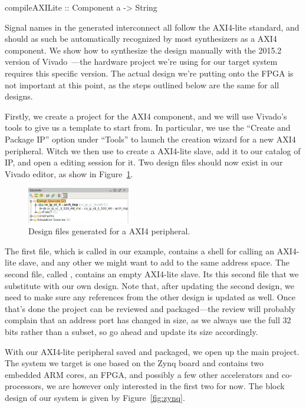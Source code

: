 \documentclass[../paper.tex]{subfiles}
\begin{document}
\begin{code}
compileAXILite :: Component a -> String
\end{code}

\noindent Signal names in the generated interconnect all follow the AXI4-lite standard, and should as such be automatically recognized by most synthesizers as a AXI4 component. We show how to synthesize the design manually with the 2015.2 version of Vivado~\cite{feist2012}---the hardware project we're using for our target system requires this specific version. The actual design we're putting onto the FPGA is not important at this point, as the steps outlined below are the same for all designs. 

Firstly, we create a project for the AXI4 component, and we will use Vivado's tools to give us a template to start from. In particular, we use the ``Create and Package IP'' option under ``Tools'' to launch the creation wizard for a new AXI4 peripheral. Witch we then use to create a AXI4-lite slave, add it to our catalog of IP, and open a editing session for it. Two design files should now exist in our Vivado editor, as show in Figure~\ref{fig:files}.

\begin{figure}[t]
\includegraphics[width=0.4\textwidth]{figures/DesignFiles}
\centering
\caption{Design files generated for a AXI4 peripheral.}
\label{fig:files}
\end{figure}

The first file, which is called  in our example, contains a shell for calling an AXI4-lite slave, and any other we might want to add to the same address space. The second file, called , contains an empty AXI4-lite slave. Its this second file that we substitute with our own design. Note that, after updating the second design, we need to make sure any references from the other design is updated as well. Once that’s done the project can be reviewed and packaged---the review will probably complain that an address port has changed in size, as we always use the full 32 bits rather than a subset, so go ahead and update its size accordingly.

With our AXI4-lite peripheral saved and packaged, we open up the main project. The system we target is one based on the Zynq board and contains two embedded ARM cores, an FPGA, and possibly a few other accelerators and co-processors, we are however only interested in the first two for now. The block design of our system is given by Figure~\ref{fig:zynq}.
\end{document}
